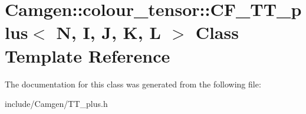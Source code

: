 \hypertarget{a00043}{\section{Camgen\-:\-:colour\-\_\-tensor\-:\-:C\-F\-\_\-\-T\-T\-\_\-plus$<$ N, I, J, K, L $>$ Class Template Reference}
\label{a00043}
}


The documentation for this class was generated from the following file\-:\begin{DoxyCompactItemize}
\item 
include/\-Camgen/T\-T\-\_\-plus.\-h\end{DoxyCompactItemize}
